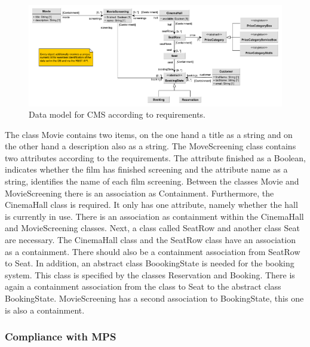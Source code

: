 \begin{figure}[H]
    \centering
    \includegraphics[width=\textwidth]{images/data-model-final.pdf}
    \caption{Data model for CMS according to requirements.}
    \label{fig:data-model}
\end{figure}

The class Movie contains two items, on the one hand a title as a string and on the other hand a description also as a string. The MoveScreening class contains two attributes according to the requirements. The attribute finished as a Boolean, indicates whether the film has finished screening and the attribute name as a string, identifies the name of each film screening. Between the classes Movie and MovieScreening there is an association as Containment. Furthermore, the CinemaHall class is required. It only has one attribute, namely whether the hall is currently in use. There is an association as containment within the CinemaHall and MovieScreening classes. Next, a class called SeatRow and another class Seat are necessary. The CinemaHall class and the SeatRow class have an association as a containment. There should also be a containment association from SeatRow to Seat. In addition, an abstract class BoookingState is needed for the booking system. This class is specified by the classes Reservation and Booking. There is again a containment association from the class to Seat to the abstract class BookingState. MovieScreening has a second association to BookingState, this one is also a containment. 

\subsubsection{Compliance with MPS}



